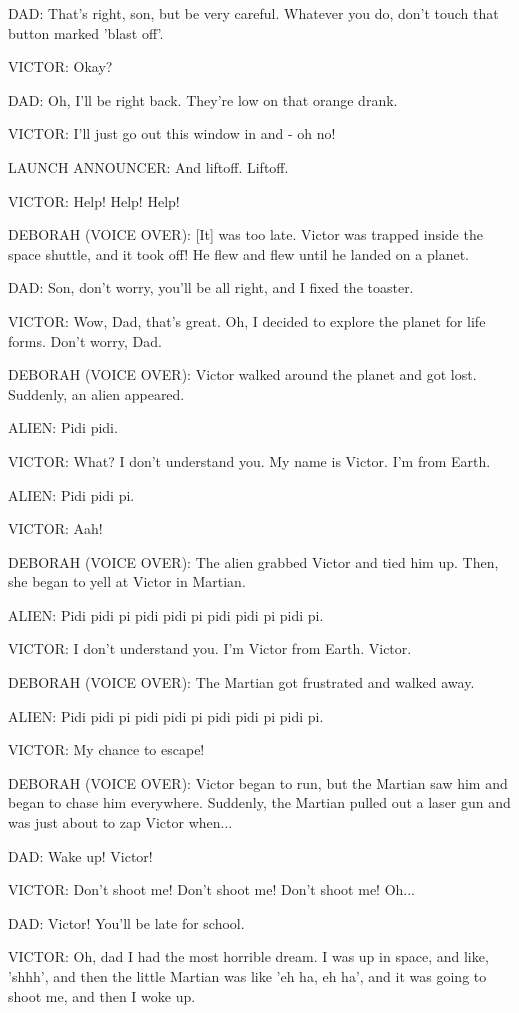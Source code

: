DAD:
That's right, son, but be very careful.
Whatever you do, don't touch that button marked 'blast off'.

VICTOR:
Okay?

DAD:
Oh, I'll be right back.
They're low on that orange drank.

VICTOR:
I'll just go out this window in and - oh no!

LAUNCH ANNOUNCER:
And liftoff. Liftoff.

VICTOR:
Help! Help! Help!

DEBORAH (VOICE OVER):
[It] was too late.
Victor was trapped inside the space shuttle, and it took off!
He flew and flew until he landed on a planet.

DAD:
Son, don't worry, you'll be all right, and I fixed the toaster.

VICTOR:
Wow, Dad, that's great.
Oh, I decided to explore the planet for life forms.
Don't worry, Dad.

DEBORAH (VOICE OVER):
Victor walked around the planet and got lost.
Suddenly, an alien appeared.

ALIEN:
Pidi pidi.

VICTOR:
What?
I don't understand you.
My name is Victor.
I'm from Earth.

ALIEN:
Pidi pidi pi.

VICTOR:
Aah!

DEBORAH (VOICE OVER):
The alien grabbed Victor and tied him up.
Then, she began to yell at Victor in Martian.

ALIEN:
Pidi pidi pi pidi pidi pi pidi pidi pi pidi pi.

VICTOR:
I don't understand you.
I'm Victor from Earth.
Victor.

DEBORAH (VOICE OVER):
The Martian got frustrated and walked away.

ALIEN:
Pidi pidi pi pidi pidi pi pidi pidi pi pidi pi.

VICTOR:
My chance to escape!

DEBORAH (VOICE OVER):
Victor began to run, but the Martian saw him and began to chase him everywhere.
Suddenly, the Martian pulled out a laser gun and was just about to zap Victor when...

DAD:
Wake up!
Victor!

VICTOR:
Don't shoot me!
Don't shoot me!
Don't shoot me!
Oh...

DAD:
Victor! You'll be late for school.

VICTOR:
Oh, dad I had the most horrible dream.
I was up in space, and like, 'shhh', and then the little Martian was like 'eh ha, eh ha', and it was going to shoot me, and then I woke up.

